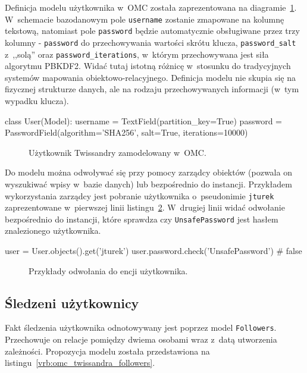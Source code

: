 Definicja modelu użytkownika w~OMC została zaprezentowana na diagramie~\ref{vrb:omc_twissandra_user}. W~schemacie bazodanowym pole \verb+username+ zostanie zmapowane na kolumnę tekstową, natomiast pole \verb+password+ będzie automatycznie obsługiwane przez trzy kolumny - \verb+password+ do przechowywania wartości skrótu klucza, \verb+password_salt+ z~,,solą'' oraz \verb+password_iterations+, w~którym przechowywana jest siła algorytmu PBKDF2. Widać tutaj istotną różnicę w~stosunku do tradycyjnych systemów mapowania obiektowo-relacyjnego. Definicja modelu nie skupia się na fizycznej strukturze danych, ale na rodzaju przechowywanych informacji (w~tym wypadku klucza).

\begin{verbbox}
	class User(Model):
	    username = TextField(partition_key=True)
	    password = PasswordField(algorithm='SHA256',
	                             salt=True, 
	                             iterations=10000)
\end{verbbox}

\begin{figure}[ht!]
	\centering
	\theverbbox
	\caption{Użytkownik Twissandry zamodelowany w~OMC.}
	\label{vrb:omc_twissandra_user}
\end{figure}

Do modelu można odwoływać się przy pomocy zarządcy obiektów (pozwala on wyszukiwać wpisy w~bazie danych) lub bezpośrednio do instancji. Przykładem wykorzystania zarządcy jest pobranie użytkownika o~pseudonimie \verb+jturek+ zaprezentowane w~pierwszej linii listingu~\ref{vrb:omc_twissandra_user_operations}. W~drugiej linii widać odwołanie bezpośrednio do instancji, które sprawdza czy \verb+UnsafePassword+ jest hasłem znalezionego użytkownika.

\begin{verbbox}
	user = User.objects().get('jturek')
	user.password.check('UnsafePassword') # false
\end{verbbox}

\begin{figure}[ht!]
	\centering
	\theverbbox
	\caption{Przykłady odwołania do encji użytkownika.}
	\label{vrb:omc_twissandra_user_operations}
\end{figure}

\subsection{Śledzeni użytkownicy}

Fakt śledzenia użytkownika odnotowywany jest poprzez model \verb+Followers+. Przechowuje on relacje pomiędzy dwiema osobami wraz z~datą utworzenia zależności. Propozycja modelu została przedstawiona na listingu~\ref{vrb:omc_twissandra_followers}.

